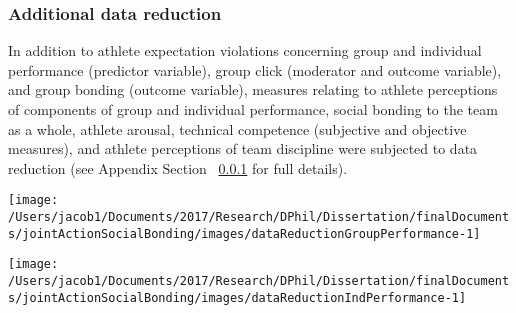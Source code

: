 \documentclass[english]{article}\usepackage[]{graphicx}\usepackage[]{color}
\makeatletter
\def\maxwidth{ %
  \ifdim\Gin@nat@width>\linewidth
    \linewidth
  \else
    \Gin@nat@width
  \fi
}
\newenvironment{knitrout}{}{} %
\makeatother
\begin{document}
\subsubsection{Additional data reduction}
In addition to athlete expectation violations concerning group and individual performance (predictor variable), group click (moderator and outcome variable), and group bonding (outcome variable), measures relating to athlete perceptions of components of group and individual performance, social bonding to the team as a whole, athlete arousal, technical competence (subjective and objective measures), and athlete perceptions of team discipline were subjected to data reduction (see Appendix Section ~\ref{} for full details).

\begin{knitrout}
\color{fgcolor}

{\centering \texttt{[image: /Users/jacob1/Documents/2017/Research/DPhil/Dissertation/finalDocuments/jointActionSocialBonding/images/dataReductionGroupPerformance-1]} 

}



\end{knitrout}

\begin{knitrout}
\color{fgcolor}

{\centering \texttt{[image: /Users/jacob1/Documents/2017/Research/DPhil/Dissertation/finalDocuments/jointActionSocialBonding/images/dataReductionIndPerformance-1]} 

}



\end{knitrout}
\end{document}
